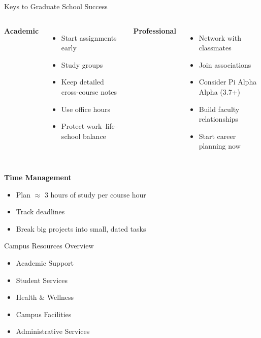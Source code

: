 \documentclass[10pt]{beamer}
\begin{document}
\begin{frame}{Keys to Graduate School Success}
\begin{columns}[T,onlytextwidth]
  \textbf{Academic}
  \begin{itemize}
    \item Start assignments early
    \item Study groups
    \item Keep detailed cross-course notes
    \item Use office hours
    \item Protect work--life--school balance
  \end{itemize}
  \textbf{Professional}
  \begin{itemize}
    \item Network with classmates
    \item Join associations
    \item Consider Pi Alpha Alpha (3.7+)
    \item Build faculty relationships
    \item Start career planning now
  \end{itemize}
\end{columns}

\vspace{0.4em}
\textbf{Time Management}
\begin{itemize}
  \item Plan \(\approx\) 3 hours of study per course hour
  \item Track deadlines
  \item Break big projects into small, dated tasks
\end{itemize}
\end{frame}

\begin{frame}{Campus Resources Overview}
\begin{itemize}
  \item Academic Support
  \item Student Services
  \item Health \& Wellness
  \item Campus Facilities
  \item Administrative Services
\end{itemize}
\end{frame}
\end{document}
